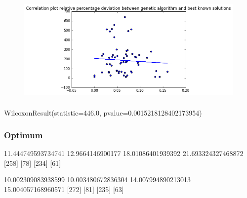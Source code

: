 \documentclass[a4paper,12pt]{article}
\begin{document}
\begin{figure}[h]
   \includegraphics[width=\textwidth]{gen.png}
\end{figure}

\subsubsection{}

WilcoxonResult(statistic=446.0, pvalue=0.0015218128402173954)


\subsubsection{Optimum}



11.444749593734741
12.9664146900177
18.01086401939392
21.693324327468872
[258]
[78]
[234]
[61]

10.002309083938599
10.003480672836304
14.007994890213013
15.004057168960571
[272]
[81]
[235]
[63]



\end{document}
